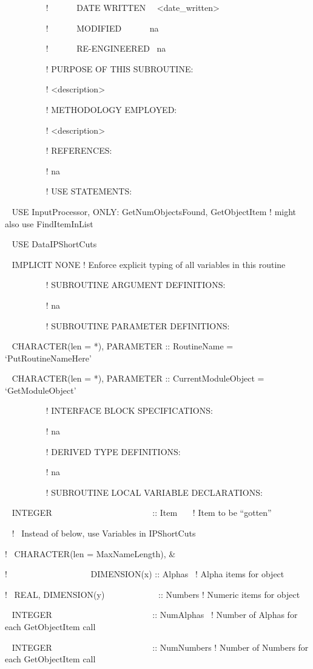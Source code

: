 ~~~~~~~~~ !~~~~~~ DATE WRITTEN~~ \textless{}date\_written\textgreater{}

~~~~~~~~~ !~~~~~~ MODIFIED~~~~~~ na

~~~~~~~~~ !~~~~~~ RE-ENGINEERED~ na

~~~~~~~~~ ! PURPOSE OF THIS SUBROUTINE:

~~~~~~~~~ ! \textless{}description\textgreater{}

~~~~~~~~~ ! METHODOLOGY EMPLOYED:

~~~~~~~~~ ! \textless{}description\textgreater{}

~~~~~~~~~ ! REFERENCES:

~~~~~~~~~ ! na

~~~~~~~~~ ! USE STATEMENTS:

~ USE InputProcessor, ONLY: GetNumObjectsFound, GetObjectItem ! might also use FindItemInList

~ USE DataIPShortCuts

~ IMPLICIT NONE ! Enforce explicit typing of all variables in this routine

~~~~~~~~~ ! SUBROUTINE ARGUMENT DEFINITIONS:

~~~~~~~~~ ! na

~~~~~~~~~ ! SUBROUTINE PARAMETER DEFINITIONS:

~ CHARACTER(len = *), PARAMETER :: RoutineName = `PutRoutineNameHere'

~ CHARACTER(len = *), PARAMETER :: CurrentModuleObject = `GetModuleObject'

~~~~~~~~~ ! INTERFACE BLOCK SPECIFICATIONS:

~~~~~~~~~ ! na

~~~~~~~~~ ! DERIVED TYPE DEFINITIONS:

~~~~~~~~~ ! na

~~~~~~~~~ ! SUBROUTINE LOCAL VARIABLE DECLARATIONS:

~ INTEGER~~~~~~~~~~~~~~~~~~~~~~~ :: Item~~~ ! Item to be ``gotten''

~ !~ Instead of below, use Variables in IPShortCuts

!~ CHARACTER(len = MaxNameLength), \&

!~~~~~~~~~~~~~~~~~~~ DIMENSION(x) :: Alphas~ ! Alpha items for object

!~ REAL, DIMENSION(y)~~~~~~~~~~~~ :: Numbers ! Numeric items for object

~ INTEGER~~~~~~~~~~~~~~~~~~~~~~~ :: NumAlphas~ ! Number of Alphas for each GetObjectItem call

~ INTEGER~~~~~~~~~~~~~~~~~~~~~~~ :: NumNumbers ! Number of Numbers for each GetObjectItem call


